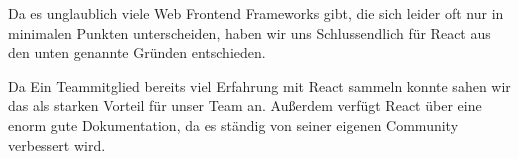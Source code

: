 \begin{flushleft}
    Da es unglaublich viele Web Frontend Frameworks gibt, die sich leider oft nur in minimalen Punkten unterscheiden,
    haben wir uns Schlussendlich für React aus den unten genannte Gründen entschieden.

    Da Ein Teammitglied bereits viel Erfahrung mit React sammeln konnte sahen wir das als starken Vorteil für unser Team an.
    Außerdem verfügt React über eine enorm gute Dokumentation, da es ständig von seiner eigenen Community verbessert wird.
\end{flushleft}